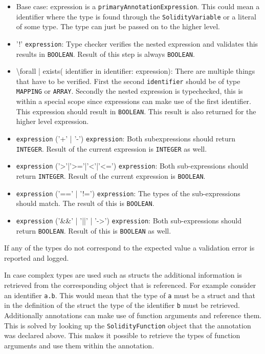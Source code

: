 \documentclass[a4paper]{article}
\begin{document}
\begin{itemize}
  \item Base case: expression is a \texttt{primaryAnnotationExpression}. This could mean a identifier where the type is found through the \texttt{SolidityVariable} or a literal of some type. The type can just be passed on to the higher level.
  \item '!' \texttt{expression}: Type checker verifies the nested expression and validates this results in \texttt{BOOLEAN}. Result of this step is always \texttt{BOOLEAN}.
  \item \textbackslash forall | exists( identifier  in identifier: expression): There are multiple things that have to be verified. First the second \texttt{identifier} should be of type \texttt{MAPPING} or \texttt{ARRAY}. Secondly the nested expression is typechecked, this is within a special scope since expressions can make use of the first identifier. This expression should result in \texttt{BOOLEAN}. This result is also returned for the higher level expression.
  \item \texttt{expression} ('+' | '-') \texttt{expression}: Both subexpressions should return \texttt{INTEGER}. Result of the current expression is \texttt{INTEGER} as well.
  \item \texttt{expression} ('>'|'>='|'<'|'<=') \texttt{expression}: Both sub-expressions should return \texttt{INTEGER}. Result of the current expression is \texttt{BOOLEAN}.
  \item \texttt{expression} ('==' | '!=') \texttt{expression}: The types of the sub-expressions should match. The result of this is \texttt{BOOLEAN}.
  \item \texttt{expression} ('\&\&' | '||' | '->') \texttt{expression}: Both sub-expressions should return \texttt{BOOLEAN}. Result of this is \texttt{BOOLEAN} as well.
\end{itemize}
If any of the types do not correspond to the expected value a validation error is reported and logged. \par
In case complex types are used such as structs the additional information is retrieved from the corresponding object that is referenced. For example consider an identifier \texttt{a.b}. This would mean that the type of \texttt{a} must be a struct and that in the definition of the struct the type of the identifier \texttt{b} must be retrieved. Additionally annotations can make use of function arguments and reference them. This is solved by looking up the \texttt{SolidityFunction} object that the annotation was declared above. This makes it possible to retrieve the types of function arguments and use them within the annotation.
\end{document}
